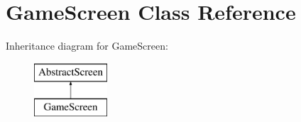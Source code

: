 \hypertarget{class_game_screen}{}\section{Game\+Screen Class Reference}
\label{class_game_screen}
Inheritance diagram for Game\+Screen\+:\begin{figure}[H]
\begin{center}
\leavevmode
\includegraphics[height=2.000000cm]{class_game_screen}
\end{center}
\end{figure}

